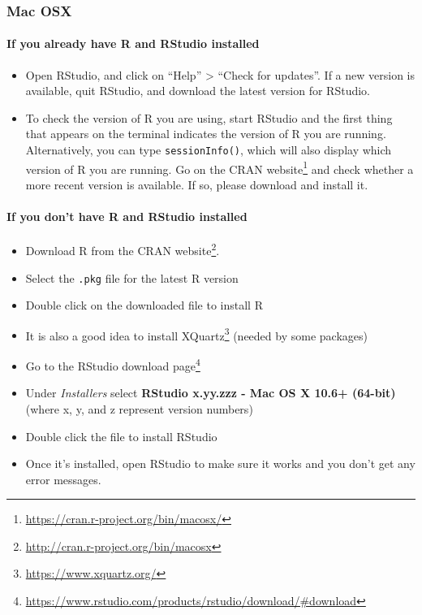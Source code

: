 \documentclass[
  12pt,
]{book}
\newcommand{\passthrough}[1]{#1}
\providecommand{\tightlist}{%
  \setlength{\itemsep}{0pt}\setlength{\parskip}{0pt}}
\renewcommand{\href}[2]{#2\footnote{\url{#1}}}
\theoremstyle{definition}
\theoremstyle{definition}
\theoremstyle{definition}
\newcommand{\1}{\mathbbm{1}}
\begin{document}
\hypertarget{mac-osx}{%
\subsubsection{Mac OSX}\label{mac-osx}}

\hypertarget{if-you-already-have-r-and-rstudio-installed-1}{%
\paragraph{If you already have R and RStudio installed}\label{if-you-already-have-r-and-rstudio-installed-1}}

\begin{itemize}
\tightlist
\item
  Open RStudio, and click on ``Help'' \textgreater{} ``Check for updates''. If a new version is
  available, quit RStudio, and download the latest version for RStudio.
\item
  To check the version of R you are using, start RStudio and the first thing
  that appears on the terminal indicates the version of R you are running.
  Alternatively, you can type \passthrough{\lstinline!sessionInfo()!}, which will also display which
  version of R you are running. Go on the \href{https://cran.r-project.org/bin/macosx/}{CRAN
  website} and check whether a more
  recent version is available. If so, please download and install it.
\end{itemize}

\hypertarget{if-you-dont-have-r-and-rstudio-installed-1}{%
\paragraph{If you don't have R and RStudio installed}\label{if-you-dont-have-r-and-rstudio-installed-1}}

\begin{itemize}
\tightlist
\item
  Download R from the \href{http://cran.r-project.org/bin/macosx}{CRAN website}.
\item
  Select the \passthrough{\lstinline!.pkg!} file for the latest R version
\item
  Double click on the downloaded file to install R
\item
  It is also a good idea to install \href{https://www.xquartz.org/}{XQuartz} (needed
  by some packages)
\item
  Go to the \href{https://www.rstudio.com/products/rstudio/download/\#download}{RStudio download
  page}
\item
  Under \emph{Installers} select \textbf{RStudio x.yy.zzz - Mac OS X 10.6+ (64-bit)}
  (where x, y, and z represent version numbers)
\item
  Double click the file to install RStudio
\item
  Once it's installed, open RStudio to make sure it works and you don't get any
  error messages.
\end{itemize}
\end{document}
